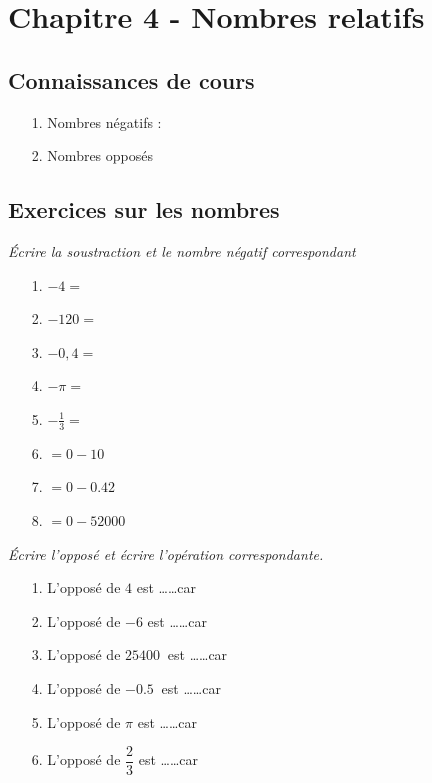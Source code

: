 



\horrule{2px}
\section*{Chapitre 4 - Nombres relatifs}
\horrule{2px}

\subsection*{Connaissances de cours}

\begin{enumerate}
  \item[1.] Nombres négatifs : \dotfill
  \item[2.] Nombres opposés \dotfill
\end{enumerate}

\subsection*{Exercices sur les nombres}

\begin{multicols}{2}

  \textit{Écrire la soustraction et le nombre négatif correspondant}

  \begin{enumerate}
    \item[1.] $  -4 = $ \dotfill
    \item[2.] $-120 = $ \dotfill
    \item[3.] $-0,4 = $ \dotfill
    \item[4.] $-\pi = $ \dotfill
    \item[5.] $ -\frac{1}{3} = $ \dotfill
    \item[6.] $= 0 - 10$  \dotfill
    \item[7.] $= 0 - \SI{0,42}{}$  \dotfill
    \item[8.] $= 0 - \SI{52000}{}$  \dotfill   
  \end{enumerate}
  \columnbreak

  \textit{Écrire l'opposé et écrire l'opération correspondante.}

  \begin{enumerate}
    \item[1.] L'opposé de $4$ est \dots \dots car \dotfill
    \item[2.] L'opposé de $-6$ est \dots \dots car \dotfill
    \item[3.] L'opposé de $\SI{25400}{}$ est \dots \dots car \dotfill
    \item[4.] L'opposé de $\SI{-0,5}{}$ est \dots \dots car \dotfill
    \item[5.] L'opposé de $\pi$ est \dots \dots car \dotfill
    \item[6.] L'opposé de $\dfrac{2}{3}$ est \dots \dots car \dotfill
  \end{enumerate}

\end{multicols}

